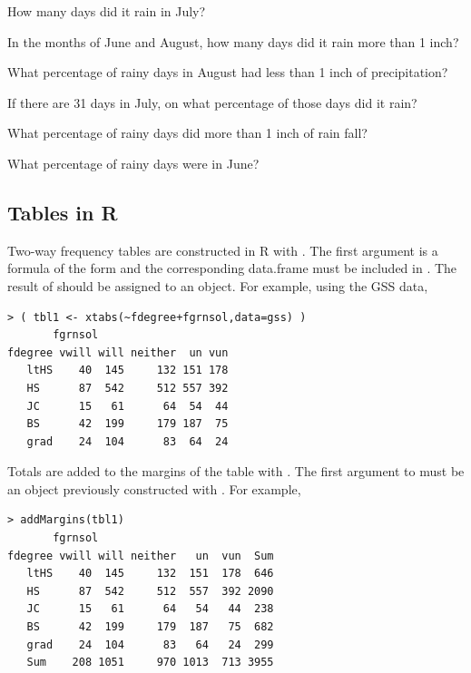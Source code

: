 \documentclass[10pt,openany]{book}\usepackage[]{graphicx}\usepackage[]{color}
\makeatletter
\newenvironment{kframe}{%
 \def\at@end@of@kframe{}%
 \ifinner\ifhmode%
  \def\at@end@of@kframe{\end{minipage}}%
  \begin{minipage}{\columnwidth}%
 \fi\fi%
 \def\FrameCommand##1{\hskip\@totalleftmargin \hskip-\fboxsep
 \colorbox{shadecolor}{##1}\hskip-\fboxsep
     \hskip-\linewidth \hskip-\@totalleftmargin \hskip\columnwidth}%
 \MakeFramed {\advance\hsize-\width
   \@totalleftmargin\z@ \linewidth\hsize
   \@setminipage}}%
 {\par\unskip\endMakeFramed%
 \at@end@of@kframe}
\newenvironment{knitrout}{}{} %
\makeatother
\begin{document}
\begin{exsection}
  \begin{Enumerate}
    \item How many days did it rain in July?
    \item In the months of June and August, how many days did it rain more than 1 inch?
    \item What percentage of rainy days in August had less than 1 inch of precipitation?
    \item If there are 31 days in July, on what percentage of those days did it rain?
    \item What percentage of rainy days did more than 1 inch of rain fall?
    \item What percentage of rainy days were in June?
  \end{Enumerate}
\end{exsection}

\subsection{Tables in R}  \label{sect:Tables2}
Two-way frequency tables are constructed in R with .  The first argument is a formula of the form  and the corresponding data.frame must be included in .  The result of  should be assigned to an object.  For example, using the GSS data,
\begin{knitrout}
\color{fgcolor}\begin{kframe}
\begin{verbatim}
> ( tbl1 <- xtabs(~fdegree+fgrnsol,data=gss) )
       fgrnsol
fdegree vwill will neither  un vun
   ltHS    40  145     132 151 178
   HS      87  542     512 557 392
   JC      15   61      64  54  44
   BS      42  199     179 187  75
   grad    24  104      83  64  24
\end{verbatim}
\end{kframe}
\end{knitrout}
Totals are added to the margins of the table with .  The first argument to  must be an object previously constructed with .  For example,
\begin{knitrout}
\color{fgcolor}\begin{kframe}
\begin{verbatim}
> addMargins(tbl1)
       fgrnsol
fdegree vwill will neither   un  vun  Sum
   ltHS    40  145     132  151  178  646
   HS      87  542     512  557  392 2090
   JC      15   61      64   54   44  238
   BS      42  199     179  187   75  682
   grad    24  104      83   64   24  299
   Sum    208 1051     970 1013  713 3955
\end{verbatim}
\end{kframe}
\end{knitrout}
\end{document}
